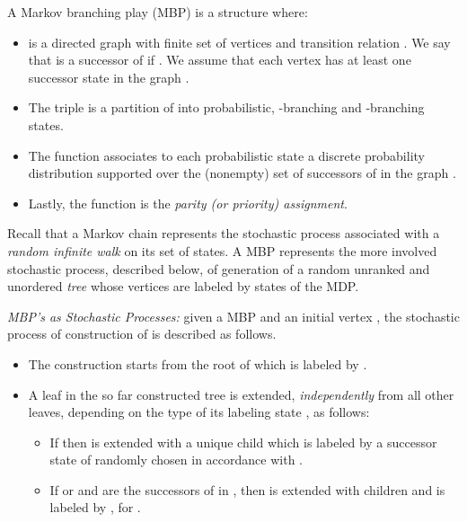 \begin{definition}
A Markov branching play (MBP) is a structure  where:
\begin{itemize}
\item   is a directed graph with finite set of vertices  and transition relation . We say that  is a successor of  if . We assume that each vertex has at least one successor state in the graph  . 
\item The triple  is a partition of  into probabilistic, -branching and -branching states.
\item The function  associates to each probabilistic state  a discrete probability distribution  supported over the (nonempty) set of successors of  in the graph . 
\item Lastly, the function  is the \emph{parity (or priority) assignment}. 
\end{itemize}\end{definition}



\begin{comment}
In what follows we identify Markov chains with MBP's without --branching nor --branching states, i.e., such that .

As usual, a Markov chain  represents the stochastic process associated with a \emph{random infinite walk} on it's set of states, i.e., an infinite sequence of states randomly generated in accordance with the probability transition function . 
\end{comment}

Recall that a Markov chain represents the stochastic process associated with a \emph{random infinite walk} on its set of states. A MBP represents the more involved stochastic process, described below, of generation of a random unranked and unordered \emph{tree}  whose vertices are labeled by states of the MDP. 

\vspace{5mm}
\noindent
\emph{MBP's as Stochastic Processes:} given a MBP  and an initial vertex , the stochastic process of construction of  is described as follows. 
\begin{itemize}
\item 
The construction starts from the root of  which is labeled by . 
\item A leaf  in the so far constructed tree  is extended, \emph{independently} from all other leaves, depending on the type of its labeling state , as follows:
\begin{itemize}
\item If  then  is extended with a unique child which is labeled by a successor state  of  randomly chosen in accordance with . 
\item If  or  and  are the successors of  in , then  is extended with  children  and  is labeled by , for . 
\end{itemize}
\end{itemize}

